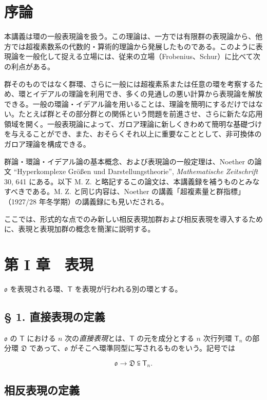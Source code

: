 \section*{序論}\label{einleitung}

本講義は環の一般表現論を扱う。この理論は、一方では有限群の表現論から、他方では超複素数系の代数的・算術的理論から発展したものである。このように表現論を一般化して捉える立場には、従来の立場（Frobenius、Schur）に比べて次の利点がある。

群そのものではなく群環、さらに一般には超複素系または任意の環を考察するため、環とイデアルの理論を利用でき、多くの見通しの悪い計算から表現論を解放できる。一般の環論・イデアル論を用いることは、理論を簡明にするだけではない。たとえば群とその部分群との関係という問題を前進させ、さらに新たな応用領域を開く。一般表現論によって、ガロア理論に新しくきわめて簡明な基礎づけを与えることができ、また、おそらくそれ以上に重要なこととして、非可換体のガロア理論を構成できる。

群論・環論・イデアル論の基本概念、および表現論の一般定理は、Noether の論文 ``Hyperkomplexe Größen und Darstellungstheorie'', \emph{Mathematische Zeitschrift} 30, 641 にある。以下 M. Z. と略記するこの論文は、本講義録を補うものとみなすべきである。M. Z. と同じ内容は、Noether の講義「超複素量と群指標」（1927/28 年冬学期）の講義録にも見いだされる。

ここでは、形式的な点でのみ新しい相反表現加群および相反表現を導入するために、表現と表現加群の概念を簡潔に説明する。

\section*{第 I 章　表現}\label{kapitel-i.-darstellungen}

$\mathfrak{o}$ を表現される環、$\mathsf T$ を表現が行われる別の環とする。

\subsection*{§ 1. 直接表現の定義}\label{definition-der-direkten-darstellung}

$\mathfrak{o}$ の $\mathsf T$ における $n$ 次の\emph{直接表現}とは、$\mathsf T$ の元を成分とする $n$ 次行列環 $\mathsf T_n$ の部分環 $\mathfrak D$ であって、$\mathfrak{o}$ がそこへ環準同型に写されるものをいう。記号では

\[
\mathfrak{o}\to\mathfrak D\subseteqq\mathsf T_n.
\]

\subsection*{相反表現の定義}\label{definition-der-reziproken-darstellung}

